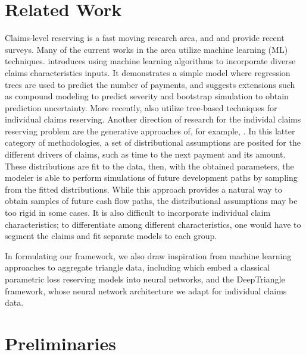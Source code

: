 \documentclass{article}
\begin{document}
\section{Related Work}

Claims-level reserving is a fast moving research area, and 
\cite{boumezouedIndividualClaims2017} and \cite{taylorLossReserving2019} provide
recent surveys. Many of the current works in the area utilize machine learning 
(ML) techniques. \cite{wuthrichMachineLearning2018} introduces using machine 
learning algorithms to incorporate diverse claims characteristics inputs. It 
demonstrates a simple model where regression trees are used to predict the
number of payments, and suggests extensions such as compound modeling to predict
severity and bootstrap simulation to obtain prediction uncertainty. More 
recently,  \cite{duvalIndividualLoss2019, lopezTreeBasedAlgorithm2019, 
baudryMachineLearning} also utilize tree-based techniques for individual claims
reserving. Another direction of research for the individal claims reserving 
problem are the generative approaches of, for example, 
\cite{antonioMicrolevelStochastic2014, pigeonIndividualLoss2013, 
pigeonIndividualLoss2014}. In this latter category of methodologies, a set of
distributional assumptions are posited for the different drivers of claims, 
such as time to the next payment and its amount. These distributions are fit to
the data, then, with the obtained parameters, the modeler is able to perform 
simulations of future development paths by sampling from the fitted 
distributions. While this approach provides a natural way to obtain samples of
future cash flow paths, the distributional assumptions may be too rigid in some 
cases. It is also difficult to incorporate individual claim characteristics; to 
differentiate among different characteristics, one would have to segment the 
claims and fit separate models to each group.

In formulating our framework, we also draw inspiration from machine learning 
approaches to aggregate triangle data, including 
\cite{gabrielliNeuralNetwork2019a, gabrielliNeuralNetwork2019} which embed a
classical parametric loss reserving models into neural networks, and the 
DeepTriangle \cite{kuoDeepTriangleDeep2018} framework, whose neural network 
architecture we adapt for individual claims data.

\section{Preliminaries}
\end{document}
